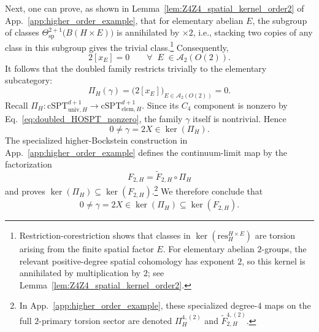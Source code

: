 \documentclass[aps,prx,reprint,superscriptaddress,twocolumn,amsmath,amssymb,amsfonts, nofootinbib]{revtex4-2}
\newcommand{\res}{\text{res}}
\theoremstyle{apsstyle}
\begin{document}
\noindent Next, one can prove, as shown in Lemma~\ref{lem:Z4Z4_spatial_kernel_order2} of App.~\ref{app:higher_order_example}, that for elementary abelian $E$, the subgroup of classes 
$\Theta^{2+1}_{\mathrm{sp}}\bigl(B(H\times E)\bigr)$ is annihilated by $\times 2$, i.e., stacking two copies of any class in this subgroup gives the trivial class.\footnote{Restriction-corestriction shows that classes in $\ker(\res^{H\times E}_{H})$ are torsion arising from the finite spatial factor $E$. For elementary abelian $2$-groups, the relevant positive-degree spatial cohomology has exponent $2$, so this kernel is annihilated by multiplication by $2$; see Lemma~\ref{lem:Z4Z4_spatial_kernel_order2}.}
Consequently,
\begin{equation}
2[x_E]=0 \qquad \forall\;\;E\;\in\mathcal A_2(O(2)).
\label{eq:doubled_HOSPT_elementary_vanishing}
\end{equation}
It follows that the doubled family restricts trivially to the
elementary subcategory:
\begin{equation}
\Pi_H(\gamma) = \bigl(2[x_E]\bigr)_{E\in\mathcal A_2(O(2))} = 0.
\label{eq:HOSPT_Pi_vanishing}
\end{equation}
Recall $\Pi_{H}:\mathrm{cSPT}_{\mathrm{univ},H}^{d+1}\to \mathrm{cSPT}_{\mathrm{elem},H}^{d+1}$.
Since its $C_4$ component is nonzero by Eq.~\eqref{eq:doubled_HOSPT_nonzero}, the family $\gamma$ itself is nontrivial. Hence
\begin{equation}
0\neq\gamma=2X\in\ker(\Pi_H).
\label{eq:HOSPT_nontrivial_kernel_Pi}
\end{equation}
The specialized higher-Bockstein construction in App.~\ref{app:higher_order_example} defines the continuum-limit map by the factorization
\begin{equation*}
F_{2,H} =
\widetilde F_{2,H}\circ\Pi_H
\end{equation*}
and proves $\ker(\Pi_H)\subseteq\ker(F_{2,H})$.\footnote{In App.~\ref{app:higher_order_example}, these specialized degree-$4$ maps on the full $2$-primary torsion sector are denoted $\Pi_H^{4,(2)}$ and $\widetilde F_{2,H}^{4,(2)}$.} We therefore conclude that
\begin{equation}
0\neq\gamma=2X
\in
\ker(\Pi_H)
\subseteq
\ker(F_{2,H}).
\label{eq:HOSPT_nontrivial_kernel_class}
\end{equation}
\end{document}
